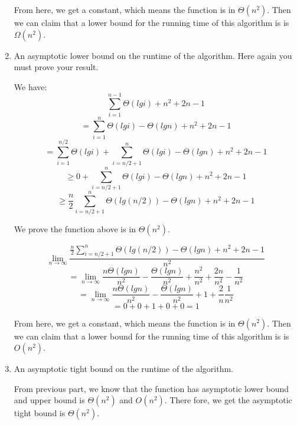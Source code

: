\documentclass{cpsc413Solutions}
\begin{document}
\begin{problemlist}
\begin{problem}
\begin{answer}
\begin{enumerate}
    
   From here, we get a constant, which means the function is in $\Theta(n^2)$. Then we can claim that a lower bound for the running time of this algorithm is is $\Omega(n^2)$.
    
    \item An asymptotic lower bound on the runtime of the algorithm. Here again you must prove your result. 
        
    We have:
    $$\sum_{i=1}^{n-1}\Theta(lgi) + n^2+2n-1$$
    $$= \sum_{i=1}^{n}\Theta(lgi) - \Theta(lgn)+ n^2+2n-1$$
    $$ = \sum_{i=1}^{n/2}\Theta(lgi) +  \sum_{i=n/2+1}^{n}\Theta(lgi) -\Theta(lgn) + n^2+2n-1$$
    $$ \geq 0 + \sum_{i=n/2+1}^{n}\Theta(lgi) -\Theta(lgn) + n^2+2n-1$$
    $$ \geq \frac{n}{2}\sum_{i=n/2+1}^{n}\Theta(lg(n/2)) -\Theta(lgn) + n^2+2n-1$$
    
    We prove the function above is in $\Theta(n^2)$.
    
    $$\lim_{n\to\infty} \frac{\frac{n}{2}\sum_{i=n/2+1}^{n}\Theta(lg(n/2)) -\Theta(lgn) + n^2+2n-1}{n^2} $$
    $$= \lim_{n\to\infty } \frac{n\Theta(lgn)}{n^2} -\frac{\Theta(lgn)}{n^2}+ \frac{n^2}{n^2} +\frac{2n}{n^2} - \frac{1}{n^2}$$
    $$= \lim_{n\to \infty} \frac{n\Theta(lgn)}{n^2}-\frac{\Theta(lgn)}{n^2}+ 1 + \frac{2}{n} \frac{1}{n^2}$$
    $$=0+0+1+0+0 = 1$$
    
      From here, we get a constant, which means the function is in $\Theta(n^2)$. Then we can claim that a lower bound for the running time of this algorithm is is ${O}(n^2)$.
   
    \item An asymptotic tight bound on the runtime of the algorithm.
    
  From previous part, we know that the function has asymptotic lower bound and upper bound is $\Theta(n^2)$ and ${O}(n^2)$. There fore, we get the asymptotic tight bound is $\Theta(n^2)$.
    
 

\end{enumerate}




\end{answer}
\end{problem}


\end{problemlist}
\end{document}
